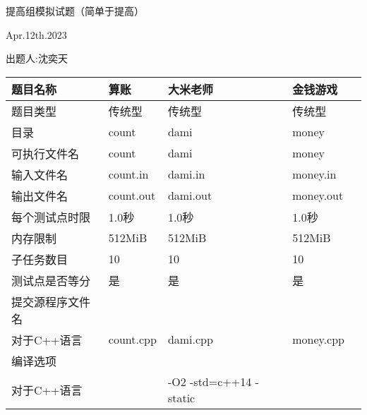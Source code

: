\documentclass[final,11pt,oneside,UTF8]{report}
\begin{document}
\centerline{\LARGE{提高组模拟试题（简单于提高）}}
\centerline{}
\centerline{\LARGE{Apr.12th.2023}}
\centerline{}
\centerline{出题人:沈奕天}
\centerline{}
\begin{table}[h]
    \centering
    \begin{tabular}{lllll}
        \hline
        \multicolumn{1}{|l|}{题目名称}    & \multicolumn{1}{l|}{算账}        & \multicolumn{1}{l|}{大米老师}                  & \multicolumn{1}{l|}{金钱游戏}      \\ \hline
        \multicolumn{1}{|l|}{题目类型}    & \multicolumn{1}{l|}{传统型}       & \multicolumn{1}{l|}{传统型}                   & \multicolumn{1}{l|}{传统型}       \\ \hline
        \multicolumn{1}{|l|}{目录}      & \multicolumn{1}{l|}{count}     & \multicolumn{1}{l|}{dami}                  & \multicolumn{1}{l|}{money}     \\ \hline
        \multicolumn{1}{|l|}{可执行文件名}  & \multicolumn{1}{l|}{count}     & \multicolumn{1}{l|}{dami}                  & \multicolumn{1}{l|}{money}     \\ \hline
        \multicolumn{1}{|l|}{输入文件名}   & \multicolumn{1}{l|}{count.in}  & \multicolumn{1}{l|}{dami.in}               & \multicolumn{1}{l|}{money.in}  \\ \hline
        \multicolumn{1}{|l|}{输出文件名}   & \multicolumn{1}{l|}{count.out} & \multicolumn{1}{l|}{dami.out}              & \multicolumn{1}{l|}{money.out} \\ \hline
        \multicolumn{1}{|l|}{每个测试点时限} & \multicolumn{1}{l|}{1.0秒}      & \multicolumn{1}{l|}{1.0秒}                  & \multicolumn{1}{l|}{1.0秒}      \\ \hline
        \multicolumn{1}{|l|}{内存限制}    & \multicolumn{1}{l|}{512MiB}    & \multicolumn{1}{l|}{512MiB}                & \multicolumn{1}{l|}{512MiB}    \\ \hline
        \multicolumn{1}{|l|}{子任务数目}   & \multicolumn{1}{l|}{10}        & \multicolumn{1}{l|}{10}                    & \multicolumn{1}{l|}{10}        \\ \hline
        \multicolumn{1}{|l|}{测试点是否等分} & \multicolumn{1}{l|}{是}         & \multicolumn{1}{l|}{是}                     & \multicolumn{1}{l|}{是}         \\ \hline
        提交源程序文件名                      &                                &                                            &                                \\ \hline
        \multicolumn{1}{|l|}{对于C++语言} & \multicolumn{1}{l|}{count.cpp} & \multicolumn{1}{l|}{dami.cpp}              & \multicolumn{1}{l|}{money.cpp} \\ \hline
        编译选项                          &                                &                                            &                                \\ \hline
        \multicolumn{1}{|l|}{对于C++语言} & \multicolumn{1}{l}{}           & \multicolumn{1}{l}{-O2 -std=c++14 -static} & \multicolumn{1}{l|}{}          \\ \hline
    \end{tabular}
\end{table}
\end{document}
